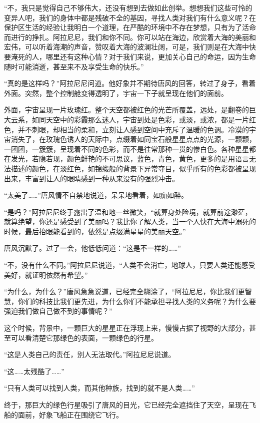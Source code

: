 “不，我只是觉得自己不够伟大，还没有想到去做如此创举。想想我们这些可怜的变异人吧，我们的身体中都是残破不全的基因，寻找人类对我们有什么意义呢？在保护区生活的经验让我明白一个道理，在严酷的环境中不存在梦想，只有为了活命而进行的挣扎。阿拉尼尼，我们和你不同。你可以站在海边，欣赏着大海的美丽和宏伟，可以听着海潮的声音，赞叹着大海的波澜壮阔，可是，我们则是在大海中快要淹死的人，哪里还有这种心情？对于我们来说，更加关心自己的命运，因为生命随时可能消逝，甚至来不及享受生命的快乐。”

“真的是这样吗？”阿拉尼尼问道。他好象并不期待唐风的回答，转过了身子，看着外面。突然，整个控制舱变得透明了，宇宙一下子就呈现在他们的面前。

外面，宇宙呈现一片玫瑰红。整个天空都被红色的光芒所覆盖，远处，是翻卷的巨大云系，如同天空中的彩霞那么迷人，宇宙到处是色彩，或淡，或浓，都是一片红色，并不刺眼，却相当的柔和，立刻让人感到空间中充斥了温暖的色调。冷漠的宇宙消失了，在玫瑰色诱人的天际中，点缀着如同宝石般星星点点的光源，一颗颗，一团团，一簇簇，呈现着不同的色彩，而不是往常那种一贯的惨白色。各种星星都在发光，若隐若现，颜色鲜艳的不可思议，蓝色，青色，黄色，更多的是用语言无法描述的颜色，在淡红色，如锦缎般的背景下异常夺目，似乎所有的色彩都被呈现出来，丰富到让人的眼睛感到一种从来没有的强烈冲击。

“太美了……”唐风情不自禁地说道，呆呆地看着，如痴如醉。

“是吗？”阿拉尼尼终于露出了温和地一丝微笑，“就算身处险境，就算前途渺茫，就算绝望，你还是感受到了美丽吗？我比你了解人类，当一个人快在大海中溺死的时候，最后抬眼能看到的，依然是点缀满星星的美丽天空。”

唐风沉默了。过了一会，他低低问道：“这是不一样的……”

“不，没有什么不同。”阿拉尼尼说道，“人类不会消亡，地球人，只要人类还能感受美好，就证明依然有希望。”

“为什么，为什么？”唐风急急说道，已经完全糊涂了，“阿拉尼尼，你比我们更智慧，你们的科技比我们更先进，为什么你们不能承担寻找人类的义务呢？为什么要强迫我们做自己做不到的事情呢？”

这个时候，背景中，一颗巨大的星星正在浮现上来，慢慢占据了视野的大部分，甚至可以看清楚它那绿色的表面，一颗绿色的行星。

“这是人类自己的责任，别人无法取代。”阿拉尼尼说道。

“这……太残酷了……”

“只有人类可以找到人类，而其他种族，找到的就不是人类……”

终于，那巨大的绿色行星吸引了唐风的目光，它已经完全遮挡住了天空，呈现在飞船的面前，好象飞船正在围绕它飞行。

